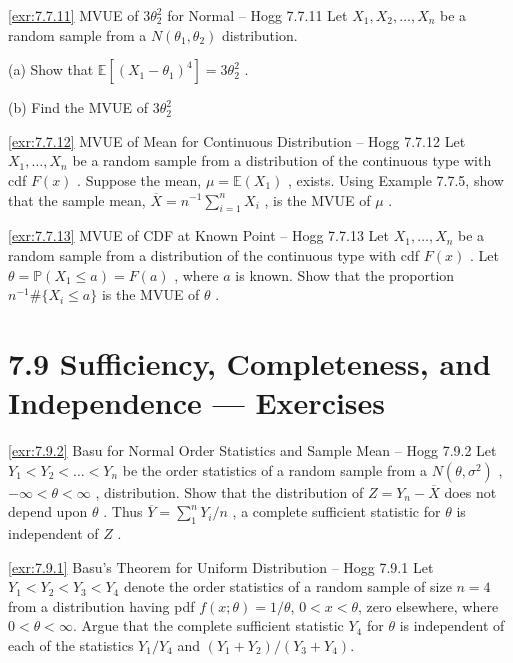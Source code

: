 \begin{exercise}{\ref{exr:7.7.11} MVUE of $3\theta_{2}^{2}$ for Normal – Hogg 7.7.11}\label{exr:7.7.11}
Let $X_{1}, X_{2}, \ldots, X_{n}$ be a random sample from a $N(\theta_{1}, \theta_{2})$ distribution.

(a) Show that $\mathbb{E}[(X_1 - \theta_1)^4] = 3\theta_2^2$ .

(b) Find the MVUE of $3\theta_2^2$
\end{exercise}

\begin{exercise}{\ref{exr:7.7.12} MVUE of Mean for Continuous Distribution – Hogg 7.7.12}\label{exr:7.7.12}
Let $X_{1},\ldots ,X_{n}$ be a random sample from a distribution of the continuous type with cdf $F(x)$ . Suppose the mean, $\mu = \mathbb{E}(X_1)$ , exists. Using Example 7.7.5, show that the sample mean, $\overline{X} = n^{-1}\sum_{i = 1}^{n}X_{i}$ , is the MVUE of $\mu$ .
\end{exercise}

\begin{exercise}{\ref{exr:7.7.13} MVUE of CDF at Known Point – Hogg 7.7.13}\label{exr:7.7.13}
Let $X_{1}, \ldots, X_{n}$ be a random sample from a distribution of the continuous type with cdf $F(x)$ . Let $\theta = \mathbb{P}(X_{1} \leq a) = F(a)$ , where $a$ is known. Show that the proportion $n^{-1} \# \{X_{i} \leq a\}$ is the MVUE of $\theta$ .
\end{exercise}

\section{7.9 Sufficiency, Completeness, and Independence — Exercises}\label{sec:7.9-exercises}

\begin{exercise}{\ref{exr:7.9.2} Basu for Normal Order Statistics and Sample Mean – Hogg 7.9.2}\label{exr:7.9.2}
Let $Y_{1} < Y_{2} < \dots < Y_{n}$ be the order statistics of a random sample from a $N(\theta, \sigma^{2})$ , $-\infty < \theta < \infty$ , distribution. Show that the distribution of $Z = Y_{n} - \overline{X}$ does not depend upon $\theta$ . Thus $\overline{Y} = \sum_{1}^{n} Y_{i} / n$ , a complete sufficient statistic for $\theta$ is independent of $Z$ .
\end{exercise}

\begin{exercise}{\ref{exr:7.9.1} Basu's Theorem for Uniform Distribution – Hogg 7.9.1}\label{exr:7.9.1}
Let $Y_{1} < Y_{2} < Y_{3} < Y_{4}$ denote the order statistics of a random sample of size $n = 4$ from a distribution having pdf $f(x; \theta) = 1/\theta$, $0 < x < \theta$, zero elsewhere, where $0 < \theta < \infty$. Argue that the complete sufficient statistic $Y_{4}$ for $\theta$ is independent of each of the statistics $Y_{1}/Y_{4}$ and $(Y_{1} + Y_{2})/(Y_{3} + Y_{4})$.
\end{exercise}

